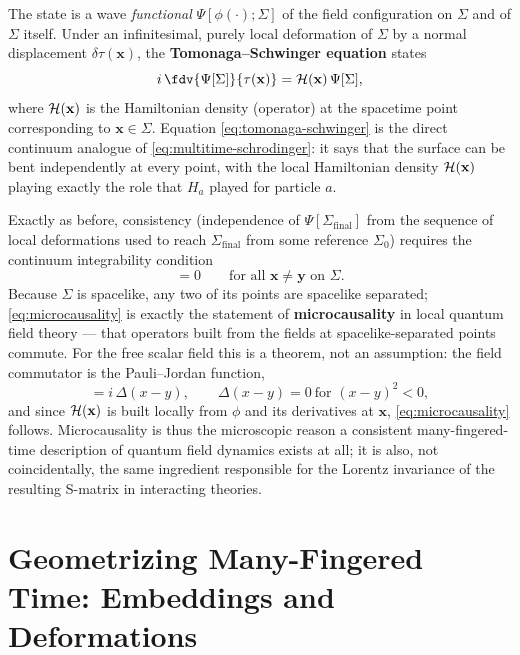 The state is a wave \emph{functional} $\Psi[\phi(\cdot);\Sigma]$ of the field
configuration on $\Sigma$ and of $\Sigma$ itself. Under an infinitesimal,
purely local deformation of $\Sigma$ by a normal displacement
$\delta\tau(\mathbf{x})$, the \textbf{Tomonaga--Schwinger equation} states
\begin{equation}
i\,\fdv{\Psi[\Sigma]}{\tau(\mathbf{x})} = \Ham(\mathbf{x})\,\Psi[\Sigma],
\label{eq:tomonaga-schwinger}
\end{equation}
where $\mathcal{H}(\mathbf{x})$ is the Hamiltonian density (operator) at the spacetime
point corresponding to $\mathbf{x}\in\Sigma$. Equation
\eqref{eq:tomonaga-schwinger} is the direct continuum analogue of
\eqref{eq:multitime-schrodinger}: it says that the surface can be bent
independently at every point, with the local Hamiltonian density
$\mathcal{H}(\mathbf{x})$ playing exactly the role that $H_a$ played for particle $a$.

Exactly as before, consistency (independence of $\Psi[\Sigma_{\mathrm{final}}]$
from the sequence of local deformations used to reach $\Sigma_{\mathrm{final}}$
from some reference $\Sigma_0$) requires the continuum integrability condition
\begin{equation}
[\Ham(\mathbf{x}),\Ham(\mathbf{y})] = 0 \qquad \text{for all } \mathbf{x}\neq\mathbf{y}\text{ on }\Sigma.
\label{eq:microcausality}
\end{equation}
Because $\Sigma$ is spacelike, any two of its points are spacelike separated;
\eqref{eq:microcausality} is exactly the statement of \textbf{microcausality}
in local quantum field theory --- that operators built from the fields at
spacelike-separated points commute. For the free scalar field this is a
theorem, not an assumption: the field commutator is the Pauli--Jordan function,
\begin{equation}
[\phi(x),\phi(y)] = i\,\Delta(x-y), \qquad \Delta(x-y)=0 \ \text{for } (x-y)^2<0,
\end{equation}
and since $\mathcal{H}(\mathbf{x})$ is built locally from $\phi$ and its derivatives
at $\mathbf{x}$, \eqref{eq:microcausality} follows. Microcausality is thus the
microscopic reason a consistent many-fingered-time description of quantum field
dynamics exists at all; it is also, not coincidentally, the same ingredient
responsible for the Lorentz invariance of the resulting S-matrix in interacting
theories.

\section{Geometrizing Many-Fingered Time: Embeddings and Deformations}
\label{sec:embeddings}

